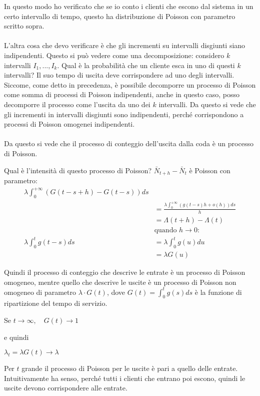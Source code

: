 \documentclass[a4paper,12pt]{book}
\begin{document}
In questo modo ho verificato che se io conto i clienti che escono dal sistema in un certo intervallo di tempo, questo ha distribuzione di Poisson con parametro scritto sopra.\\
\\
L'altra cosa che devo verificare è che gli incrementi su intervalli disgiunti siano indipendenti. Questo si può vedere come una decomposizione: considero $ k $ intervalli $ I_1, ..., I_k $. Qual è la probabilità che un cliente esca in uno di questi $ k $ intervalli? Il suo tempo di uscita deve corrispondere ad uno degli intervalli. Siccome, come detto in precedenza, è possibile decomporre un processo di Poisson come somma di processi di Poisson indipendenti, anche in questo caso, posso decomporre il processo come l'uscita da uno dei $ k $ intervalli. Da questo si vede che gli incrementi in intervalli disgiunti sono indipendenti, perché corrispondono a processi di Poisson omogenei indipendenti. \\
\\
Da questo si vede che il processo di conteggio dell'uscita dalla coda è un processo di Poisson.

Qual è l'intensità di questo processo di Poisson?
$ \bar{N}_{t+h} - \bar{N}_{t} $ è Poisson con parametro:
\begin{align*}
	\lambda \int_{0}^{+\infty}(G(t-s+h) - G(t-s)) ds \\
	& = \frac{\lambda\int_{0}^{+\infty} (g(t-s)h + o(h)) ds }{h} \\
	& = \Lambda(t+h) - \Lambda(t) \\
	& \text{quando } h \to 0 \text{: }\\
	\lambda\int_{0}^{t}g(t-s)ds & = \lambda\int_{0}^{t} g(u)du \\
	& = \lambda G(u)
\end{align*}

Quindi il processo di conteggio che descrive le entrate è un processo di Poisson omogeneo, mentre quello che descrive le uscite è un processo di Poisson non omogeneo di parametro $\lambda \cdot G(t)$, dove
$ G(t) = \int_{0}^{t} g(s) ds $ è la funzione di ripartizione del tempo di servizio. 

Se $ t \to \infty, \quad G(t) \to 1 $

e quindi 

$ \lambda_t = \lambda G(t) \to \lambda $

Per $ t $ grande il processo di Poisson per le uscite è pari a quello delle entrate. Intuitivamente ha senso, perché tutti i clienti che entrano poi escono, quindi le uscite devono corrispondere alle entrate. 
\end{document}
